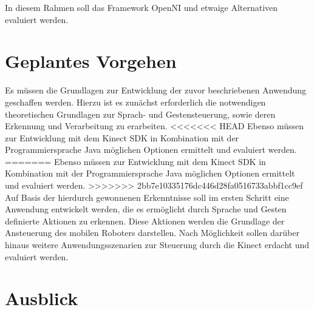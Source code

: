 In diesem Rahmen soll das Framework OpenNI und etwaige Alternativen evaluiert werden.


\section{Geplantes Vorgehen}


%

Es m\"ussen die Grundlagen zur Entwicklung der zuvor beschriebenen Anwendung geschaffen werden. 
Hierzu ist es zun\"achst erforderlich die notwendigen theoretischen Grundlagen zur Sprach- und Gestensteuerung, sowie deren Erkennung und Verarbeitung zu erarbeiten.
<<<<<<< HEAD
Ebenso m\"ussen  zur Entwicklung mit dem Kinect \acrshort{SDK} in Kombination mit der Programmiersprache Java m\"oglichen Optionen ermittelt und evaluiert werden.
=======
Ebenso m\"ussen  zur Entwicklung mit dem Kinect SDK in Kombination mit der Programmiersprache Java m\"oglichen Optionen ermittelt und evaluiert werden.
>>>>>>> 2bb7e10335176dc446d28fa0516733abbf1cc9ef
Auf Basis der hierdurch gewonnenen Erkenntnisse soll im ersten Schritt eine Anwendung entwickelt werden, die es erm\"oglicht durch Sprache und Gesten definierte Aktionen zu erkennen. 
Diese Aktionen werden die Grundlage der Ansteuerung des mobilen Roboters darstellen.
\newline
Nach M\"oglichkeit sollen dar\"uber hinaus weitere Anwendungsszenarien zur Steuerung durch die Kinect erdacht und evaluiert werden.

\section{Ausblick}


